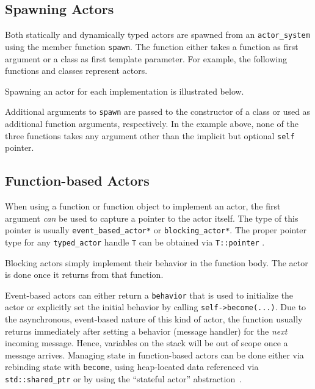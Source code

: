 \clearpage
\subsection{Spawning Actors}
\label{spawn}

Both statically and dynamically typed actors are spawned from an \lstinline^actor_system^ using the member function \lstinline^spawn^. The function either takes a function as first argument or a class as first template parameter. For example, the following functions and classes represent actors.



Spawning an actor for each implementation is illustrated below.



Additional arguments to \lstinline^spawn^ are passed to the constructor of a class or used as additional function arguments, respectively. In the example above, none of the three functions takes any argument other than the implicit but optional \lstinline^self^ pointer.

\subsection{Function-based Actors}
\label{function-based}

When using a function or function object to implement an actor, the first argument \emph{can} be used to capture a pointer to the actor itself.
The type of this pointer is usually \lstinline^event_based_actor*^ or \lstinline^blocking_actor*^.
The proper pointer type for any \lstinline^typed_actor^ handle \lstinline^T^ can be obtained via \lstinline^T::pointer^ .

Blocking actors simply implement their behavior in the function body. The actor is done once it returns from that function.

Event-based actors can either return a \lstinline^behavior^  that is used to initialize the actor or explicitly set the initial behavior by calling \lstinline^self->become(...)^. Due to the asynchronous, event-based nature of this kind of actor, the function usually returns immediately after setting a behavior (message handler) for the \emph{next} incoming message. Hence, variables on the stack will be out of scope once a message arrives. Managing state in function-based actors can be done either via rebinding state with \lstinline^become^, using heap-located data referenced via \lstinline^std::shared_ptr^ or by using the ``stateful actor'' abstraction~.

